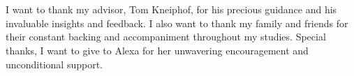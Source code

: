 

\chapter*{}
\label{sec:acknowledgement}

I want to thank my advisor, Tom Kneiphof, for his precious guidance and his invaluable insights and feedback.
I also want to thank my family and friends for their constant backing and accompaniment throughout my studies.
Special thanks, I want to give to Alexa for her unwavering encouragement and unconditional support.
